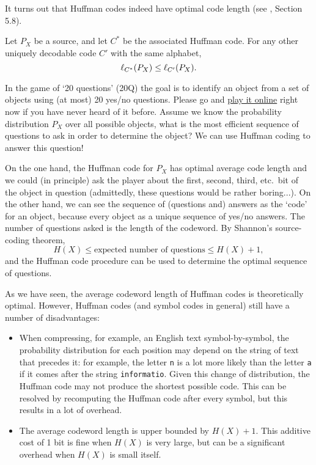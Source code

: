It turns out that Huffman codes indeed have optimal code length (see \CT, Section 5.8).

\begin{theorem}
Let $P_X$ be a source, and let $C^*$ be the associated Huffman code. For any other uniquely decodable code $C'$ with the same alphabet,
\[
\ell_{C^*}(P_X) \leq \ell_{C'}(P_X).
\]
\end{theorem}

\begin{example}[20 questions]
In the game of `20 questions' (20Q) the goal is to identify an object from a set of objects using (at most) 20 yes/no questions. Please go and \href{http://www.20q.net/}{play it online} right now if you have never heard of it before.  Assume we know the probability distribution $P_X$ over all possible objects, what is the most efficient sequence of questions to ask in order to determine the object? We can use Huffman coding to answer this question!

On the one hand, the Huffman code for $P_X$ has optimal average code length and we could (in principle) ask the player about the first, second, third, etc.\ bit of the object in question (admittedly, these questions would be rather boring...). On the other hand, we can see the sequence of (questions and) answers as the `code' for an object, because every object as a unique sequence of yes/no answers. The number of questions asked is the length of the codeword. By Shannon's source-coding theorem,
\[
H(X) \leq \mbox{expected number of questions} \leq H(X) + 1,
\]
and the Huffman code procedure can be used to determine the optimal sequence of questions.
\end{example}
As we have seen, the average codeword length of Huffman codes is theoretically optimal. However, Huffman codes (and symbol codes in general) still have a number of disadvantages:
\begin{itemize}
\item When compressing, for example, an English text symbol-by-symbol, the probability distribution for each position may depend on the string of text that precedes it: for example, the letter \texttt{n} is a lot more likely than the letter \texttt{a} if it comes after the string \texttt{informatio}. Given this change of distribution, the Huffman code may not produce the shortest possible code. This can be resolved by recomputing the Huffman code after every symbol, but this results in a lot of overhead.
\item The average codeword length is upper bounded by $H(X) + 1$. This additive cost of 1 bit is fine when $H(X)$ is very large, but can be a significant overhead when $H(X)$ is small itself.
\end{itemize}

